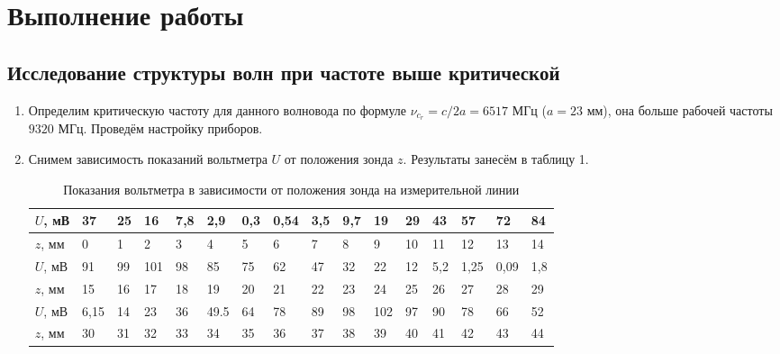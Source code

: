 \documentclass[a4paper]{article}
\begin{document}
\section{Выполнение работы}
\subsection{Исследование структуры волн при частоте выше критической}
\begin{enumerate}
\subsubsection{Определение длины волны СВЧ-сигнала в волноводе}
    \item Определим критическую частоту для данного волновода по формуле $\nu_c_r = c/2a = 6517$ МГц ($a = 23$ мм), она больше рабочей частоты $9320$ МГц. Проведём настройку приборов.
    \item Снимем зависимость показаний вольтметра $U$ от положения зонда $z$. Результаты занесём в таблицу 1.
    
    \begin{table}[h]
    \centering
    \begin{center}
    \caption{Показания вольтметра в зависимости от положения зонда на измерительной линии}
    \end{center}
    \vspace{0.1cm}
    \label{tab:my_label}
    \begin{tabular}{ |p{1.5cm}||p{0.5cm}|p{0.5cm}|p{0.5cm}|p{0.5cm}|p{0.5cm}|p{0.5cm}|p{0.5cm}|p{0.5cm}|p{0.5cm}|p{0.5cm}|p{0.5cm}|p{0.5cm}|p{0.5cm}|p{0.5cm}|p{0.5cm}|  }
 \hline
 $U$, мВ & 37 & 25 & 16 & 7,8 & 2,9 & 0,3 & 0,54 & 3,5 & 9,7 & 19 & 29 & 43 & 57 & 72 & 84   \\
\hline 
 $z$, мм & 0 & 1 & 2 & 3 & 4 & 5 & 6 & 7 & 8 & 9 & 10 & 11 & 12 & 13 & 14 \\
 \hline 
 \hline 
 
 $U$, мВ & 91 & 99 & 101 & 98 & 85 & 75 & 62 & 47 & 32 & 22 & 12 & 5,2 & 1,25 & 0,09 & 1,8 \\
 \hline 
  $z$, мм & 15 & 16 & 17 & 18 & 19 & 20 & 21 & 22 & 23 & 24 & 25 & 26 & 27 & 28 & 29  \\
 \hline 
 \hline 
 $U$, мВ & 6,15 & 14 & 23 & 36 & 49.5 & 64 & 78 & 89 & 98 & 102 & 97 & 90 & 78 & 66 & 52 \\  
 \hline
  $z$, мм & 30 & 31 & 32 & 33 & 34 & 35 & 36 & 37 & 38 & 39 & 40 & 41 & 42 & 43 & 44 \\
 \hline
\end{tabular}


\end{table}
\end{enumerate}
\end{document}
